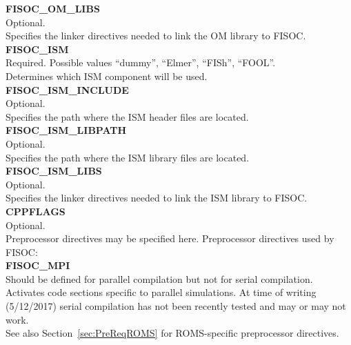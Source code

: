 \documentclass[12pt]{article}
\begin{document}
\begin{flushleft}
\textbf{FISOC\_OM\_LIBS}                            \\
Optional.                                           \\
Specifies the linker directives needed to link the OM library to FISOC. \\
\vspace{6pt}
\textbf{FISOC\_ISM}                                 \\
Required. Possible values ``dummy'', ``Elmer'', ``FISh'', ``FOOL''.     \\
Determines which ISM component will be used.        \\
\vspace{6pt}
\textbf{FISOC\_ISM\_INCLUDE}                        \\ 
Optional.                                           \\
Specifies the path where the ISM header files are located.\\
\vspace{6pt}
\textbf{FISOC\_ISM\_LIBPATH}                        \\
Optional.                                           \\
Specifies the path where the ISM library files are located.\\
\vspace{6pt}
\textbf{FISOC\_ISM\_LIBS}                           \\
Optional.                                           \\
Specifies the linker directives needed to link the ISM library to FISOC. \\
\vspace{6pt}
\textbf{CPPFLAGS}                                   \\
Optional.                                           \\
Preprocessor directives may be specified here.  
Preprocessor directives used by FISOC:              \\
\textbf{FISOC\_MPI}                                 \\ 
Should be defined for parallel compilation but not for 
serial compilation.  Activates code sections specific to parallel simulations. 
At time of writing (5/12/2017) serial compilation has not been recently tested
and may or may not work.                            \\
See also Section~\ref{sec:PreReqROMS} for ROMS-specific preprocessor directives.
\end{flushleft}
\end{document}
